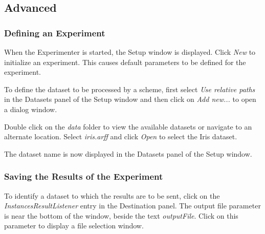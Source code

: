 \documentclass[a4paper]{article}
\begin{document}

\newpage
\subsection{Advanced}

\subsubsection{Defining an Experiment}

When the Experimenter is started, the Setup window is displayed. Click \textit{New} to initialize an experiment. This causes default parameters to be defined for the experiment.
\begin{center}
\end{center}

To define the dataset to be processed by a scheme, first select \textit{Use relative paths} in the Datasets panel of the Setup window and then click on \textit{Add new...} to open a dialog window.
\begin{center}
\end{center}

Double click on the \textit{data} folder to view the available datasets or navigate to an alternate location. Select \textit{iris.arff} and click \textit{Open} to select the Iris dataset.
\begin{center}
\end{center}
	
\begin{center}
\end{center}

The dataset name is now displayed in the Datasets panel of the Setup window.



\subsubsection*{Saving the Results of the Experiment}

To identify a dataset to which the results are to be sent, click on the \textit{InstancesResultListener} entry in the Destination panel. The output file parameter is near the bottom of the window, beside the text \textit{outputFile}. Click on this parameter to display a file selection window.
\begin{center}
\end{center}
	
\end{document}
